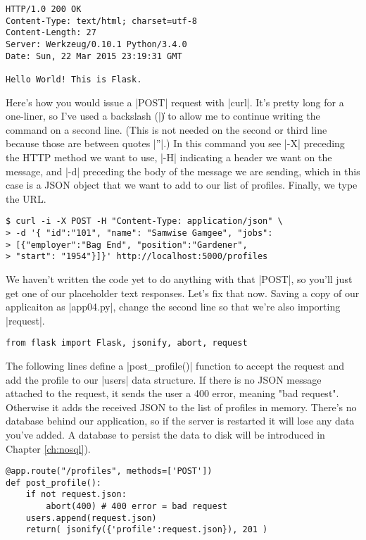 \documentclass[11pt]{book}
\begin{document}
\begin{verbatim}
HTTP/1.0 200 OK
Content-Type: text/html; charset=utf-8
Content-Length: 27
Server: Werkzeug/0.10.1 Python/3.4.0
Date: Sun, 22 Mar 2015 23:19:31 GMT

Hello World! This is Flask.
\end{verbatim}

Here's how you would issue a |POST| request with |curl|.  It's pretty long for a one-liner, so I've used a backslash (|\|) to allow me to continue writing the command on a second line. (This is not needed on the second or third line because those are between quotes |''|.)  In this command you see |-X| preceding the HTTP method we want to use, |-H| indicating a header we want on the message, and |-d| preceding the body of the message we are sending, which in this case is a JSON object that we want to add to our list of profiles.  Finally, we type the URL.

\begin{verbatim}
$ curl -i -X POST -H "Content-Type: application/json" \
> -d '{ "id":"101", "name": "Samwise Gamgee", "jobs":
> [{"employer":"Bag End", "position":"Gardener",
> "start": "1954"}]}' http://localhost:5000/profiles
\end{verbatim}

We haven't written the code yet to do anything with that |POST|, so you'll just get one of our placeholder text responses.  Let's fix that now.  Saving a copy of our applicaiton as |app04.py|, change the second line so that we're also importing |request|.

\begin{verbatim}
from flask import Flask, jsonify, abort, request
\end{verbatim}

The following lines define a |post_profile()| function to accept the request and add the profile to our |users| data structure.  If there is no JSON message attached to the request, it sends the user a 400 error, meaning "bad request".  Otherwise it adds the received JSON to the list of profiles in memory.  There's no database behind our application, so if the server is restarted it will lose any data you've added.  A database to persist the data to disk will be introduced in Chapter \ref{ch:nosql}).

\begin{verbatim}
@app.route("/profiles", methods=['POST'])
def post_profile():
    if not request.json:
        abort(400) # 400 error = bad request
    users.append(request.json)
    return( jsonify({'profile':request.json}), 201 )
\end{verbatim}
\end{document}
